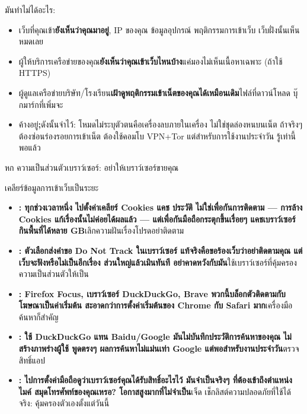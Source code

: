 มันทำไม่ได้อะไร:

\begin{itemize}
  \item เว็บที่คุณเข้า\textbf{ยังเห็นว่าคุณมาอยู่}, IP ของคุณ ข้อมูลอุปกรณ์ พฤติกรรมการเข้าเว็บ เว็บฝั่งนั้นเห็นหมดเลย
  \item ผู้ให้บริการเครือข่ายของคุณ\textbf{ยังเห็นว่าคุณเข้าเว็บไหนบ้าง}แค่มองไม่เห็นเนื้อหาเฉพาะ (ถ้าใช้ HTTPS)
  \item ผู้ดูแลเครือข่ายบริษัท/โรงเรียน\textbf{เฝ้าดูพฤติกรรมเข้าเน็ตของคุณได้เหมือนเดิม}ไฟล์ที่ดาวน์โหลด บุ๊กมาร์กที่เพิ่มจะ
  \item ค้างอยู่\textbf{;}ดังนั้นจำไว้: โหมดไม่ระบุตัวตนคือเครื่องลบภายในเครื่อง ไม่ใช่ชุดล่องหนบนเน็ต ถ้าจริงๆ ต้องซ่อนร่องรอยการเข้าเน็ต ต้องใช้คอมโบ VPN+Tor แต่สำหรับการใช้งานประจำวัน รู้เท่านี้พอแล้ว
\end{itemize}

หก ความเป็นส่วนตัวเบราว์เซอร์: อย่าให้เบราว์เซอร์ขายคุณ


เคลียร์ข้อมูลการเข้าเว็บเป็นระยะ

\begin{itemize}
  \item \textbf{: ทุกช่วงเวลาหนึ่ง ไปตั้งค่าเคลียร์ Cookies แคช ประวัติ ไม่ใช่เพื่อกันการติดตาม — การล้าง Cookies แก้เรื่องนั้นไม่ค่อยได้ผลแล้ว — แต่เพื่อกันมือถือกระตุกขึ้นเรื่อยๆ แคชเบราว์เซอร์กินพื้นที่ได้หลาย GB}เลิกความฝันเรื่องโปรดอย่าติดตาม
  \item \textbf{: ตัวเลือกส่งคำขอ Do Not Track ในเบราว์เซอร์ แท้จริงคือขอร้องเว็บว่าอย่าติดตามคุณ แต่เว็บจะฟังหรือไม่เป็นอีกเรื่อง ส่วนใหญ่แล้วเมินทันที อย่าคาดหวังกับมัน}ใช้เบราว์เซอร์ที่คุ้มครองความเป็นส่วนตัวให้เป็น
  \item \textbf{: Firefox Focus, เบราว์เซอร์ DuckDuckGo, Brave พวกนี้บล็อกตัวติดตามกับโฆษณาเป็นค่าเริ่มต้น สะอาดกว่าการตั้งค่าเริ่มต้นของ Chrome กับ Safari มาก}เครื่องมือค้นหาก็สำคัญ
  \item \textbf{: ใช้ DuckDuckGo แทน Baidu/Google มันไม่บันทึกประวัติการค้นหาของคุณ ไม่สร้างภาพร่างผู้ใช้ พูดตรงๆ ผลการค้นหาไม่แม่นเท่า Google แต่พอสำหรับงานประจำวัน}ตรวจสิทธิ์แอป
  \item \textbf{: ไปการตั้งค่ามือถือดูว่าเบราว์เซอร์คุณได้รับสิทธิ์อะไรไว้ มันจำเป็นจริงๆ ที่ต้องเข้าถึงตำแหน่ง ไมค์ สมุดโทรศัพท์ของคุณเหรอ? โอกาสสูงมากที่ไม่จำเป็น}เจ็ด เช็กลิสต์ความปลอดภัยที่ใช้ได้จริง: คุ้มครองตัวเองตั้งแต่วันนี้
\end{itemize}

